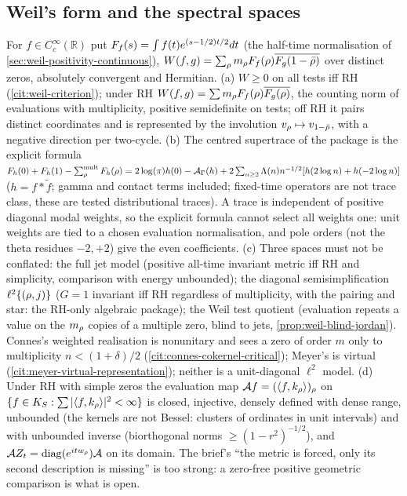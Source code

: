 \subsection{Weil's form and the spectral spaces}

\begin{proposition}
\label{prop:weil-form-not-metric}
For $f\in C_c^\infty(\mathbb R)$ put $F_f(s) = \int f(t)e^{(s-1/2)t/2}dt$ (the half-time normalisation of
\cref{sec:weil-positivity-continuous}), $W(f,g) = \sum_\rho m_\rho F_f(\rho)\overline{F_g(1-\bar{\rho})}$ over distinct zeros,
absolutely convergent and Hermitian. (a) $W\ge0$ on all tests iff RH (\cref{cit:weil-criterion}); under RH
$W(f,g) = \sum m_\rho F_f(\rho)\overline{F_g(\rho)}$, the counting norm of evaluations with multiplicity, positive
semidefinite on tests; off RH it pairs distinct coordinates and is represented by the involution $v_\rho\mapsto v_{1-\bar{\rho}}$,
with a negative direction per two-cycle. (b) The centred supertrace of the package is the explicit formula
$F_h(0)+F_h(1)-\sum^{\mathrm{mult}}_\rho F_h(\rho) = 2\log(\pi)h(0)-\mathcal A_\Gamma(h)+2\sum_{n\ge2}\Lambda(n)n^{-1/2}[h(2\log n)+h(-2\log n)]$
($h = f*\tilde f$; gamma and contact terms included; fixed-time operators are not trace class, these are tested
distributional traces). A trace is independent of positive diagonal modal weights, so the explicit formula cannot select
all weights one: unit weights are tied to a chosen evaluation normalisation, and pole orders (not the theta residues
$-2,+2$) give the even coefficients. (c) Three spaces must not be conflated: the full jet model (positive all-time invariant
metric iff RH and simplicity, comparison with energy unbounded); the diagonal semisimplification $\ell^2\{(\rho,j)\}$
($G = 1$ invariant iff RH regardless of multiplicity, with the pairing and star: the RH-only algebraic package); the Weil
test quotient (evaluation repeats a value on the $m_\rho$ copies of a multiple zero, blind to jets, \cref{prop:weil-blind-jordan}).
Connes's weighted realisation is nonunitary and sees a zero of order $m$ only to multiplicity $n<(1+\delta)/2$
(\cref{cit:connes-cokernel-critical}); Meyer's is virtual (\cref{cit:meyer-virtual-representation}); neither is a unit-diagonal
$\ell^2$ model. (d) Under RH with simple zeros the evaluation map $\mathcal Af = (\langle f,k_\rho\rangle)_\rho$ on
$\{f\in K_S:\sum|\langle f,k_\rho\rangle|^2<\infty\}$ is closed, injective, densely defined with dense range, unbounded (the
kernels are not Bessel: clusters of ordinates in unit intervals) and with unbounded inverse (biorthogonal norms
$\ge(1-r^2)^{-1/2}$), and $\mathcal AZ_t = \mathrm{diag}(e^{it w_\rho})\mathcal A$ on its domain. The brief's ``the metric is
forced, only its second description is missing'' is too strong: a zero-free positive geometric comparison is what is open.
\end{proposition}

